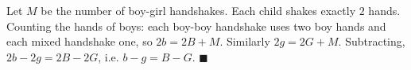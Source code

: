Let $M$ be the number of boy-girl handshakes. Each child shakes exactly $2$ hands. Counting the hands of boys: each boy-boy handshake uses two boy hands and each mixed handshake one, so $2b=2B+M$. Similarly $2g=2G+M$. Subtracting, $2b-2g=2B-2G$, i.e. $b-g=B-G$. $\blacksquare$
